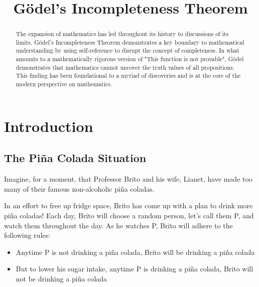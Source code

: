 \documentclass[conference]{IEEEtran}
\begin{document}
\title{Gödel's Incompleteness Theorem\\}

\author{
\and
{}
\and
{}
}

\maketitle

\begin{abstract}
The expansion of mathematics has led throughout its history to discussions of its limits. Gödel's Incompleteness Theorem demonstrates a key boundary to mathematical understanding by using self-reference to disrupt the concept of completeness. In what amounts to a mathematically rigorous version of "This function is not provable", Gödel demonstrates that mathematics cannot uncover the truth values of all propositions. This finding has been foundational to a myriad of discoveries and is at the core of the modern perspective on mathematics.
\end{abstract}

\section{Introduction}
\subsection{The Piña Colada Situation}
Imagine, for a moment, that Professor Brito and his wife, Lianet, have made too many of their famous non-alcoholic piña coladas.

In an effort to free up fridge space, Brito has come up with a plan to drink more piña coladas! Each day, Brito will choose a random person, let's call them P, and watch them throughout the day. As he watches P, Brito will adhere to the following rules:
\begin{itemize}
    \item Anytime P is not drinking a piña colada, Brito will be drinking a piña colada
    \item But to lower his sugar intake, anytime P is drinking a piña colada, Brito will not be drinking a piña colada
\end{itemize}
\end{document}
